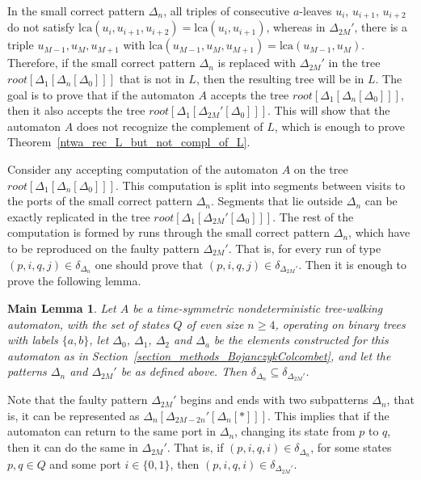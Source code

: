 \documentclass[12pt,a4paper]{article}
\newtheorem*{mainlemma}{Main Lemma}
\theoremstyle{definition}
\begin{document}
In the small correct pattern $\Delta_n$, all triples of consecutive $a$-leaves 
$u_i$, $u_{i+1}$, $u_{i+2}$
do not satisfy $\mathrm{lca}(u_i, u_{i+1},u_{i+2}) = \mathrm{lca}(u_i,u_{i+1})$,
whereas in $\Delta_{2M}'$, there is a triple $u_{M-1}, u_{M}, u_{M+1}$
with $\mathrm{lca}(u_{M-1},u_{M}, u_{M+1}) = \mathrm{lca}(u_{M-1},u_M)$.
Therefore, if the small correct pattern $\Delta_n$ is replaced with $\Delta_{2M}'$
in the tree $\mathit{root}[\Delta_1[\Delta_n[\Delta_0]]]$ that is not in $L$,
then the resulting tree will be in $L$.
The goal is to prove that if the automaton $A$
accepts the tree $\mathit{root}[\Delta_1[\Delta_n[\Delta_0]]]$,
then it also accepts the tree $\mathit{root}[\Delta_1[\Delta_{2M}'[\Delta_0]]]$.
This will show that the automaton $A$ does not recognize the complement of $L$,
which is enough to prove Theorem~\ref{ntwa_rec_L_but_not_compl_of_L}.

Consider any accepting computation of the automaton $A$
on the tree $\mathit{root}[\Delta_1[\Delta_n[\Delta_0]]]$.
This computation is split into segments between visits to the ports of the small correct pattern $\Delta_n$.
Segments that lie outside $\Delta_n$
can be exactly replicated in the tree $\mathit{root}[\Delta_1[\Delta_{2M}'[\Delta_0]]]$.
The rest of the computation is formed by runs through the small correct pattern $\Delta_n$,
which have to be reproduced on the faulty pattern $\Delta_{2M}'$.
That is, for every run of type $(p,i,q,j) \in \delta_{\Delta_n}$
one should prove that $(p,i,q,j) \in \delta_{\Delta_{2M}'}$.
Then it is enough to prove the following lemma.

\begin{mainlemma}
Let $A$ be a time-symmetric nondeterministic tree-walking automaton,
with the set of states $Q$ of even size $n \geqslant 4$,
operating on binary trees with labels $\{a,b\}$,
let $\Delta_0$, $\Delta_1$, $\Delta_2$ and $\Delta_a$
be the elements constructed for this automaton
as in Section~\ref{section_methods_BojanczykColcombet},
and let the patterns $\Delta_n$ and $\Delta_{2M}'$ be as defined above.
Then $\delta_{\Delta_n} \subseteq \delta_{\Delta_{2M}'}$.
\end{mainlemma}

Note that the faulty pattern $\Delta_{2M}'$ begins and ends with two subpatterns $\Delta_n$,
that is, it can be represented as $\Delta_n[\Delta_{2M-2n}'[\Delta_n[*]]]$.
This implies that if the automaton can return to the same port in $\Delta_n$,
changing its state from $p$ to $q$, then it can do the same in $\Delta_{2M}'$.
That is, if $(p,i,q,i) \in \delta_{\Delta_n}$, for some states $p,q \in Q$ and some port $i \in \{0, 1\}$,
then $(p,i,q,i) \in \delta_{\Delta_{2M}'}$.
\end{document}
